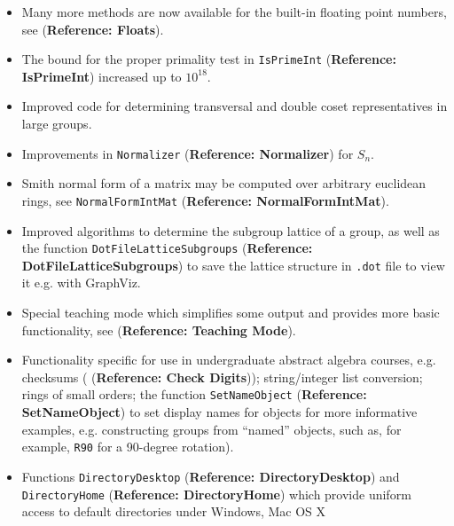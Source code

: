 \documentclass[a4paper,11pt]{report}
\begin{document}
{{{\begin{itemize}
\begin{itemize}
\item  Functions and iterators are now available to create and enumerate simple
groups by their order up to isomorphism: \texttt{SimpleGroup} (\textbf{Reference: SimpleGroup}), \texttt{SmallSimpleGroup} (\textbf{Reference: SmallSimpleGroup}), \texttt{SimpleGroupsIterator} (\textbf{Reference: SimpleGroupsIterator}) and \texttt{AllSmallNonabelianSimpleGroups} (\textbf{Reference: AllSmallNonabelianSimpleGroups}). 
\item  See also packages \textsf{CTblLib}, \textsf{IRREDSOL} and \textsf{Smallsemi} listed in Section \ref{New and updated packages since GAP 4.4.12}. 
\end{itemize}
 
\item  Many more methods are now available for the built-in floating point numbers,
see  (\textbf{Reference: Floats}). 
\item  The bound for the proper primality test in \texttt{IsPrimeInt} (\textbf{Reference: IsPrimeInt}) increased up to $10^{18}$. 
\item  Improved code for determining transversal and double coset representatives in
large groups. 
\item  Improvements in \texttt{Normalizer} (\textbf{Reference: Normalizer}) for $S_n$. 
\item  Smith normal form of a matrix may be computed over arbitrary euclidean rings,
see \texttt{NormalFormIntMat} (\textbf{Reference: NormalFormIntMat}). 
\item  Improved algorithms to determine the subgroup lattice of a group, as well as
the function \texttt{DotFileLatticeSubgroups} (\textbf{Reference: DotFileLatticeSubgroups}) to save the lattice structure in \texttt{.dot} file to view it e.g. with \textsf{GraphViz}. 
\item  Special teaching mode which simplifies some output and provides more basic
functionality, see  (\textbf{Reference: Teaching Mode}). 
\item  Functionality specific for use in undergraduate abstract algebra courses, e.g.
checksums ( (\textbf{Reference: Check Digits})); string/integer list conversion; rings of small orders; the function \texttt{SetNameObject} (\textbf{Reference: SetNameObject}) to set display names for objects for more informative examples, e.g.
constructing groups from ``named'' objects, such as, for example, \texttt{R90} for a 90-degree rotation).  
\item  Functions \texttt{DirectoryDesktop} (\textbf{Reference: DirectoryDesktop}) and \texttt{DirectoryHome} (\textbf{Reference: DirectoryHome}) which provide uniform access to default directories under Windows, Mac OS X

\end{itemize}}}}
\end{document}
